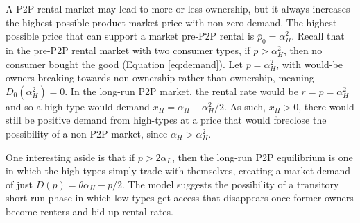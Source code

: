 \documentclass[11pt]{article}
\begin{document}

A P2P rental market may lead to more or less ownership, but it always increases the highest possible product market price with non-zero demand. 
The highest possible price that can support a market pre-P2P rental is $\bar{p}_0 = \alpha_H^2$.
Recall that in the pre-P2P rental market with two consumer types, if $p > \alpha_H^2$, then no consumer bought the good (Equation \ref{eq:demand}).
Let $p = \alpha_H^2$, with would-be owners breaking towards non-ownership rather than ownership, meaning $D_0(\alpha_H^2) = 0$. 
In the long-run P2P market, the rental rate would be $r = p = \alpha_H^2$ and so a high-type would demand $x_H = \alpha_H - \alpha_H^2/2$.
As such, $x_H > 0$, there would still be positive demand from high-types at a price that would foreclose the possibility of a non-P2P market, since  $\alpha_H > \alpha_H^2$.  

One interesting aside is that if $p > 2 \alpha_L$, then the long-run P2P equilibrium is one in which the high-types simply trade with themselves, creating a market demand of just $D(p) = \theta \alpha_H - p/2$. 
The model suggests the possibility of a transitory short-run phase in which low-types get access that disappears once former-owners become renters and bid up rental rates. 
\end{document}
